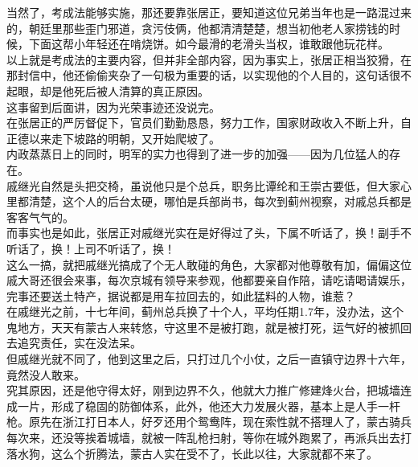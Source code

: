 \begin{multicols}{\theparacolNo}
当然了，考成法能够实施，那还要靠张居正，要知道这位兄弟当年也是一路混过来的，朝廷里那些歪门邪道，贪污伎俩，他都清清楚楚，想当初他老人家捞钱的时候，下面这帮小年轻还在啃烧饼。如今最滑的老滑头当权，谁敢跟他玩花样。\\

以上就是考成法的主要内容，但并非全部内容，因为事实上，张居正相当狡猾，在那封信中，他还偷偷夹杂了一句极为重要的话，以实现他的个人目的，这句话很不起眼，却是他死后被人清算的真正原因。\\

这事留到后面讲，因为光荣事迹还没说完。\\

在张居正的严厉督促下，官员们勤勤恳恳，努力工作，国家财政收入不断上升，自正德以来走下坡路的明朝，又开始爬坡了。\\

内政蒸蒸日上的同时，明军的实力也得到了进一步的加强——因为几位猛人的存在。\\

戚继光自然是头把交椅，虽说他只是个总兵，职务比谭纶和王崇古要低，但大家心里都清楚，这个人的后台太硬，哪怕是兵部尚书，每次到蓟州视察，对戚总兵都是客客气气的。\\

而事实也是如此，张居正对戚继光实在是好得过了头，下属不听话了，换！副手不听话了，换！上司不听话了，换！\\

这么一搞，就把戚继光搞成了个无人敢碰的角色，大家都对他尊敬有加，偏偏这位戚大哥还很会来事，每次京城有领导来参观，他都要亲自作陪，请吃请喝请娱乐，完事还要送土特产，据说都是用车拉回去的，如此猛料的人物，谁惹？\\

在戚继光之前，十七年间，蓟州总兵换了十个人，平均任期1.7年，没办法，这个鬼地方，天天有蒙古人来转悠，守这里不是被打跑，就是被打死，运气好的被抓回去追究责任，实在没法呆。\\

但戚继光就不同了，他到这里之后，只打过几个小仗，之后一直镇守边界十六年，竟然没人敢来。\\

究其原因，还是他守得太好，刚到边界不久，他就大力推广修建烽火台，把城墙连成一片，形成了稳固的防御体系，此外，他还大力发展火器，基本上是人手一杆枪。原先在浙江打日本人，好歹还用个鸳鸯阵，现在索性就不搭理人了，蒙古骑兵每次来，还没等挨着城墙，就被一阵乱枪扫射，等你在城外跑累了，再派兵出去打落水狗，这么个折腾法，蒙古人实在受不了，长此以往，大家就都不来了。\\


\end{multicols}
